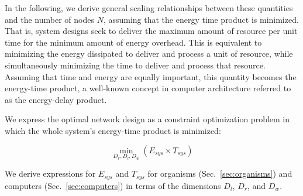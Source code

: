 \documentclass[12pt]{article}
\begin{document}
In the following, we derive general scaling relationships between these
quantities and the number of nodes $N$, assuming that the energy time product
is minimized.  That is, system designs seek to deliver the maximum amount of
resource per unit time for the minimum amount of energy overhead.   This is
equivalent to minimizing the energy dissipated to deliver and process a unit of
resource, while simultaneously minimizing the time to deliver and process that
resource.  Assuming that time and energy are equally important, this quantity
becomes the energy-time product, a well-known concept in computer architecture
referred to as the energy-delay product.  


We express the optimal network design as a constraint optimization 
problem in which the whole system's energy-time product is minimized:

\begin{equation}
  \min_{D_r,D_l,D_w}(E_{sys} \times T_{sys})
\label{eq:TheWholeEnchilada}
\end{equation}


We derive expressions for $E_{sys}$ and $T_{sys}$ for organisms
(Sec.~\ref{sec:organisms}) and computers (Sec.~\ref{sec:computers}) in
terms of the dimensions $D_l$, $D_r$, and $D_w$.  


\end{document}
